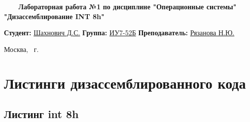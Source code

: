 \documentclass[a4paper,14pt]{article}
\begin{document}
\begin{titlepage}
		\begin{center}
			\noindent\begin{minipage}{1.0\textwidth}\centering
				\Large\textbf{   ~~~ Лабораторная работа №1}\newline
				\textbf{по дисциплине "Операционные системы"}\newline
				\textbf{"Дизассемблирование INT 8h"}\newline
			\end{minipage}
		\end{center}
		\noindent\textbf{Студент:} \underline{Шахнович Д.С.}\newline\newline
		\noindent\textbf{Группа:} \underline{ИУ7-52Б}\newline\newline
		\noindent\textbf{Преподаватель:} \underline{Рязанова Н.Ю.}\newline
		
		\begin{center}
			\mbox{}
			\vfill
			Москва, \the\year ~г.
		\end{center}
		\clearpage
	\end{titlepage}
	
	\section{Листинги дизассемблированного кода}
	\subsection{Листинг int 8h}
	
\end{document}
